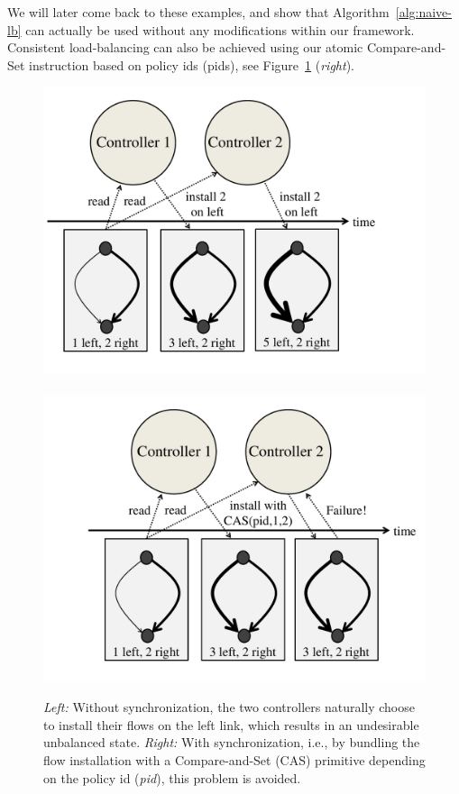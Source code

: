 \documentclass[conference]{sigcomm-alternate}
\begin{document}
We will later come back to these examples, and show that Algorithm~\ref{alg:naive-lb} 
can actually be used without any modifications within our framework. 
Consistent load-balancing can also be achieved using our atomic Compare-and-Set instruction based on policy ids (pids),
see Figure~\ref{fig:CAS-example} (\emph{right}).

\begin{figure}[t]
\centering
\includegraphics[width=.56\columnwidth]{loadbal-1.pdf}~\hspace{-.7cm}~\includegraphics[width=.56\columnwidth]{loadbal-2.pdf}\\
\caption{\emph{Left:} Without synchronization, the two controllers naturally choose to
install their flows on the left link, which results in an undesirable
unbalanced state.
 \emph{Right:}
 With synchronization, i.e., by bundling the flow installation with a Compare-and-Set (CAS) primitive
 depending on the policy id (\emph{pid}), this problem is avoided.}\label{fig:CAS-example}
\end{figure}


%
\end{document}
